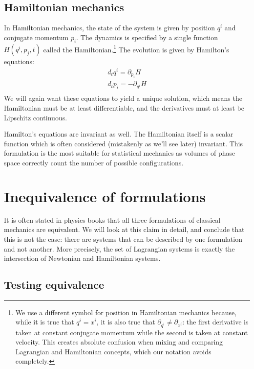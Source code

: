 \subsection{Hamiltonian mechanics}

In Hamiltonian mechanics, the state of the system is given by position $q^i$ and conjugate momentum $p_i$. The dynamics is specified by a single function $H(q^i, p_j, t)$ called the Hamiltonian.\footnote{We use a different symbol for position in Hamiltonian mechanics because, while it is true that $q^i = x^i$, it is also true that $\partial_{q^i} \neq \partial_{x^i}$: the first derivative is taken at constant conjugate momentum while the second is taken at constant velocity. This creates absolute confusion when mixing and comparing Lagrangian and Hamiltonian concepts, which our notation avoids completely.} The evolution is given by Hamilton's equations:
\begin{equation}\label{rp-cm-HamiltonEq}
	\begin{aligned}
		d_t q^i = \partial_{p_i} H \\
		d_t p_i = - \partial_{q^i} H \\
	\end{aligned}
\end{equation}
We will again want these equations to yield a unique solution, which means the Hamiltonian must be at least differentiable, and the derivatives must at least be Lipschitz continuous.

Hamilton's equations are invariant as well. The Hamiltonian itself is a scalar function which is often considered (mistakenly as we'll see later) invariant. This formulation is the most suitable for statistical mechanics as volumes of phase space correctly count the number of possible configurations.

\section{Inequivalence of formulations}\label{rp-cm-inequivalenceOfFormulations}

It is often stated in physics books that all three formulations of classical mechanics are equivalent. We will look at this claim in detail, and conclude that this is not the case: there are systems that can be described by one formulation and not another. More precisely, the set of Lagrangian systems is exactly the intersection of Newtonian and Hamiltonian systems.

\subsection{Testing equivalence}

